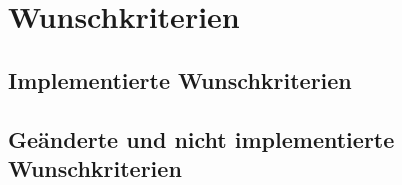 
\section{Wunschkriterien}

    \subsection{Implementierte Wunschkriterien}

    \subsection{Geänderte und nicht implementierte Wunschkriterien}
